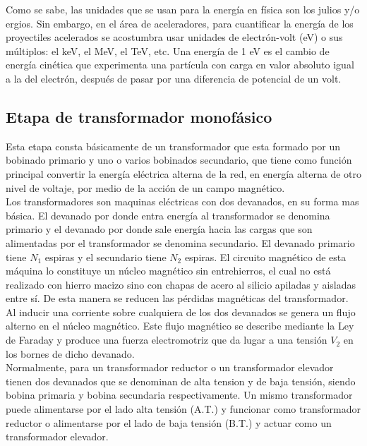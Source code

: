 Como se sabe, las unidades que se usan para la energía en física son los julios
y/o ergios. Sin embargo, en el área de aceleradores, para cuantificar la energía de los proyectiles acelerados se acostumbra usar unidades de electrón-volt (eV)  o sus múltiplos: el keV, el MeV, el TeV, etc. Una energía de 1 eV es el cambio de energía cinética que experimenta una partícula con carga en valor absoluto igual a la del electrón, después de pasar por una diferencia de potencial de un volt. \cite{const}

\newpage



\subsection{Etapa de transformador monofásico}

Esta etapa consta básicamente de un transformador que esta formado por un bobinado primario y uno o varios bobinados secundario, que tiene como función principal
convertir la energía eléctrica alterna de la red, en energía alterna de otro nivel de voltaje, por medio de la acción de un campo magnético.\\

Los transformadores son maquinas eléctricas con dos devanados, en su forma mas básica. El devanado por donde entra energía al transformador se denomina primario y el devanado por donde sale energía hacia las cargas que son alimentadas por el transformador se denomina secundario. El devanado primario tiene $N_{1}$ espiras y el secundario tiene $N_{2}$ espiras. El circuito magnético de esta máquina lo constituye un núcleo magnético sin entrehierros, el cual no está realizado con hierro macizo sino con chapas de acero al silicio apiladas y aisladas entre sí. De esta manera se reducen las pérdidas magnéticas del transformador.\\

Al inducir una corriente sobre cualquiera de los dos devanados se genera un flujo alterno en el núcleo magnético. Este flujo magnético se describe mediante la Ley de Faraday y produce una fuerza electromotriz que da lugar a una tensión $V_{2}$ en los bornes de dicho devanado.\\

Normalmente, para un transformador reductor o un transformador elevador tienen dos devanados que se denominan de alta tension y de baja tensión, siendo bobina primaria y bobina secundaria respectivamente. Un mismo transformador puede alimentarse por el lado alta tensión (A.T.) y funcionar como transformador reductor o alimentarse por el lado de baja tensión (B.T.) y actuar como un transformador elevador.

